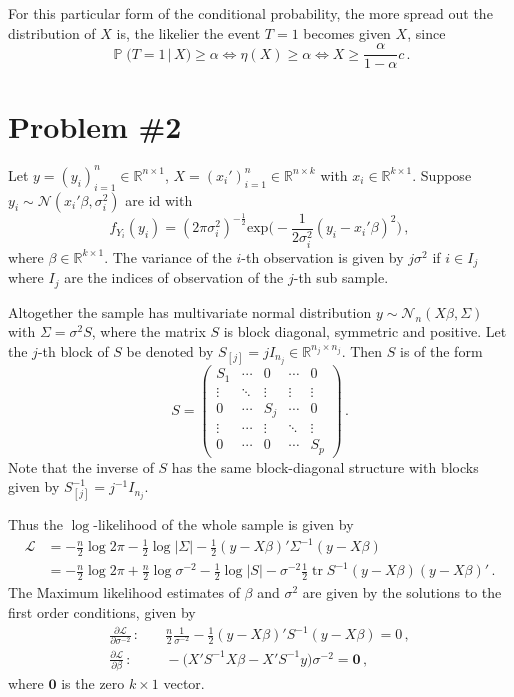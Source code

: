 \documentclass[a4paper,12pt]{extarticle}
\newcommand{\tr}{\mathop{\text{tr}}\nolimits}
\newcommand{\pr}{\mathop{\mathbb{P}}\nolimits}
\begin{document}
For this particular form of the conditional probability, the more spread out the distribution
of $X$ is, the likelier the event $T=1$ becomes given $X$, since
$$ \pr\bigl(T=1\,\big\vert\,X \bigr) \geq \alpha
  \Leftrightarrow \eta(X) \geq \alpha
  \Leftrightarrow X\geq \frac{\alpha}{1-\alpha}c
  \,. $$


\section{Problem \#2} %
\label{sec:problem_2}
Let $y=(y_i)_{i=1}^n \in \mathbb{R}^{n\times 1}$, $X=(x_i')_{i=1}^n\in \mathbb{R}^{n\times k}$
with $x_i\in\mathbb{R}^{k\times 1}$. Suppose $y_i\sim \mathcal{N}(x_i'\beta, \sigma_i^2)$ are
id with
$$ f_{Y_i}(y_i) = (2\pi \sigma_i^2)^{-\frac{1}{2}}
  \text{exp}\bigl(-\frac{1}{2\sigma_i^2}(y_i-x_i'\beta)^2 \bigr) \,, $$
where $\beta \in\mathbb{R}^{k\times 1}$. The variance of the $i$-th observation
is given by $j \sigma^2$ if $i\in I_j$ where $I_j$ are the indices of observation
of the $j$-th sub sample.

Altogether the sample has multivariate normal distribution $y \sim \mathcal{N}_n(X\beta, \Sigma)$
with $\Sigma = \sigma^2 S$, where the matrix $S$ is block diagonal, symmetric and positive.
Let the $j$-th block of $S$ be denoted by $S_{[j]} = j I_{n_j} \in \mathbb{R}^{n_j\times n_j}$.
Then $S$ is of the form
$$ S = \begin{pmatrix}
  S_1 & \cdots & 0 & \cdots & 0 \\
  \vdots & \ddots & \vdots &\vdots & \vdots\\
  0 & \cdots & S_j & \cdots & 0 \\
  \vdots & \cdots & \vdots & \ddots & \vdots\\
  0 & \cdots & 0 & \cdots & S_p
\end{pmatrix}\,. $$
Note that the inverse of $S$ has the same block-diagonal structure with blocks given
by $S^{-1}_{[j]} = j^{-1}I_{n_j}$.

Thus the $\log$-likelihood of the whole sample is given by
\begin{align*}
\mathcal{L}
  &= -\frac{n}{2} \log 2\pi
    - \frac{1}{2} \log\bigl\lvert \Sigma\bigr\rvert
    - \frac{1}{2} (y-X\beta)'\Sigma^{-1}(y-X\beta)\\
  &= -\frac{n}{2} \log 2\pi
    + \frac{n}{2} \log\sigma^{-2}
    - \frac{1}{2} \log \bigl\lvert S\bigr\rvert
    - \sigma^{-2} \frac{1}{2} \tr S^{-1}(y-X\beta)(y-X\beta)'
    \,.
\end{align*}
The Maximum likelihood estimates of $\beta$ and $\sigma^2$ are given by the solutions to
the first order conditions, given by \begin{align*}
\frac{\partial\mathcal{L}}{\partial \sigma^{-2}}\,:
  &\quad \frac{n}{2} \frac{1}{\sigma^{-2}} - \frac{1}{2} (y-X\beta)'S^{-1}(y-X\beta) = 0\,,\\
\frac{\partial\mathcal{L}}{\partial \beta}\,:
  &\quad - \bigl(X'S^{-1}X \beta - X'S^{-1} y \bigr)\sigma^{-2} = \mathbf{0}\,,
\end{align*}
where $\mathbf{0}$ is the zero $k\times 1$ vector.
\end{document}
